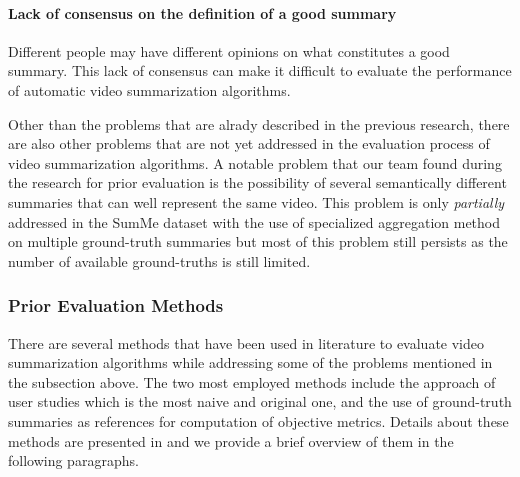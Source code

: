 			\paragraph[short]{Lack of consensus on the definition of a good summary}
				Different people may have different opinions on what constitutes a good summary. This lack of consensus can make it difficult to evaluate the performance of automatic video summarization algorithms.

		Other than the problems that are alrady described in the previous research, there are also other problems that are not yet addressed in the evaluation process of video summarization algorithms. A notable problem that our team found during the research for prior evaluation is the possibility of several semantically different summaries that can well represent the same video. This problem is only \textit{partially} addressed in the SumMe dataset with the use of specialized aggregation method on multiple ground-truth summaries but most of this problem still persists as the number of available ground-truths is still limited.

	\subsubsection{Prior Evaluation Methods}
	\label{subsubsec:rel-evaluation-prior}
		There are several methods that have been used in literature to evaluate video summarization algorithms while addressing some of the problems mentioned in the subsection above. The two most employed methods include the approach of user studies which is the most naive and original one, and the use of ground-truth summaries as references for computation of objective metrics. Details about these methods are presented in \cite{Apostolidis2021Video} and we provide a brief overview of them in the following paragraphs.


